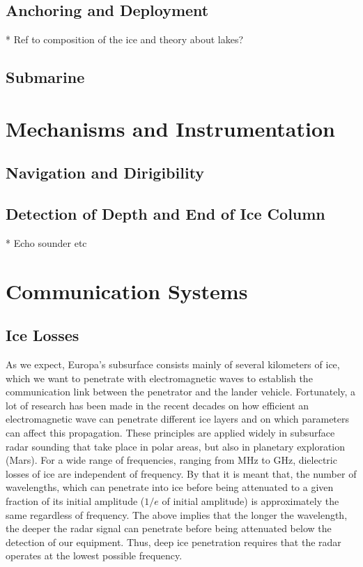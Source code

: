 \subsection{Anchoring and Deployment}

* Ref to composition of the ice and theory about lakes?

\subsection{Submarine}

\section{Mechanisms and Instrumentation}

\subsection{Navigation and Dirigibility}

\subsection{Detection of Depth and End of Ice Column}

* Echo sounder etc

\section{Communication Systems}

\subsection{Ice Losses}
As we expect, Europa's subsurface consists mainly of several kilometers of ice, which we want to penetrate with electromagnetic waves to establish the communication link between the penetrator and the lander vehicle. Fortunately, a lot of research has been made in the recent decades on how efficient an electromagnetic wave can penetrate different ice layers and on which parameters can affect this propagation. These principles are applied widely in subsurface radar sounding that take place in polar areas, but also in planetary exploration (Mars). For a wide range of frequencies, ranging from MHz to GHz, dielectric losses of ice are independent of frequency. By that it is meant that, the number of wavelengths, which can penetrate into ice before being attenuated to a given fraction of its initial amplitude ($1/e$ of initial amplitude) is approximately the same regardless of frequency. The above implies that the longer the wavelength, the deeper the radar signal can penetrate before being attenuated below the detection of our equipment. Thus, deep ice penetration requires that the radar operates at the lowest possible frequency. 

